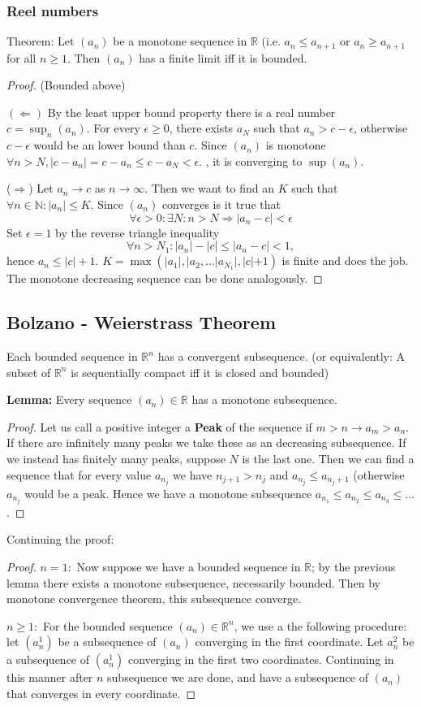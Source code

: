 \documentclass[titlepage]{article}
\begin{document}
\subsubsection{Reel numbers}
Theorem: Let $(a_n)$ be a monotone sequence in $\mathbb{R}$ (i.e. $a_n \leq a_{n+1}$ or $a_n \geq a_{n+1}$ for all $n\geq1$. Then $(a_n)$ has a finite limit iff it is bounded.
\begin{proof}
(Bounded above)

$(\Leftarrow)$
By the least upper bound property there is a real number $c = \sup_n (a_n)$. For every $\epsilon \geq 0$, there exists $a_N$ such that $a_n > c-\epsilon$, otherwise $c-\epsilon$ would be an lower bound than $c$. Since $(a_n)$ is monotone $\forall n>N, |c-a_n| = c-a_n \leq c-a_N < \epsilon.$ , it is converging to $\sup(a_n)$.

($\Rightarrow$) Let $a_n \rightarrow c$ as $n\rightarrow \infty$. Then we want to find an $K$ such that $\forall n \in \mathbb{N}: |a_n|\leq K$. Since $(a_n)$ converges is it true that $$\forall \epsilon >0: \exists N: n>N \Longrightarrow |a_n - c| < \epsilon$$
Set  $\epsilon = 1$ by the reverse triangle inequality
$$\forall n >N_1 : |a_n| - |c| \leq |a_n - c| < 1,$$
hence $a_n \leq |c| + 1$.
$K = \max \left(|a_1|, |a_2, ...|a_{N_1}|, |c|+1\right)$ is finite and does the job. The monotone decreasing sequence can be done analogously.
\end{proof}
\subsection{Bolzano - Weierstrass Theorem}
Each bounded sequence in $\mathbb{R}^n$ has a convergent subsequence. 
(or equivalently: A subset of $\mathbb{R}^n$ is sequentially compact iff it is closed and bounded)

\textbf{Lemma:}
Every sequence $(a_n) \in \mathbb{R}$ has a monotone subsequence.
\begin{proof}

Let us call a positive integer a \textbf{Peak} of the sequence if $m>n \rightarrow a_m>a_n$. If there are infinitely many peaks we take these as an decreasing subsequence.
If we instead has finitely many peaks, suppose $N$ is the last one. Then we can find a sequence that for every value $a_{n_j}$ we have 
$n_{j+1} > n_j$ and $a_{n_j} \leq a_{n_j+1}$ (otherwise $a_{n_j}$ would be a peak. Hence we have a monotone subsequence $a_{n_1} \leq a_{n_2} \leq a_{n_3} \leq \ldots $.
\end{proof}
Continuing the proof:
\begin{proof}
$n= 1:$ Now suppose we have a bounded sequence in $\mathbb{R}$; by the previous lemma there exists a monotone subsequence, necessarily bounded. Then by monotone convergence theorem, this subsequence converge.

$n \geq 1: $ For the bounded sequence $(a_n) \in \mathbb{R}^n$, we use a the following procedure:
let $(a_n^1)$ be a subsequence of $(a_n)$  converging in the first coordinate. Let $a_n^2$ be a subsequence of  $(a_n^1)$ converging in the first two coordinates. Continuing in this manner after $n$ subsequence we are done, and have a subsequence of $(a_n)$ that converges in every coordinate.
\end{proof}
\end{document}
